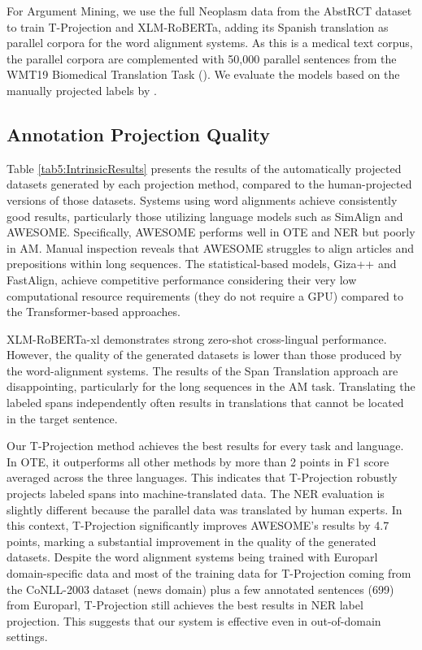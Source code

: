 For Argument Mining, we use the full Neoplasm data from the AbstRCT dataset to train T-Projection and XLM-RoBERTa, adding its Spanish translation as parallel corpora for the word alignment systems. As this is a medical text corpus, the parallel corpora are complemented with 50,000 parallel sentences from the WMT19 Biomedical Translation Task (\cite{bawden-etal-2019-findings}). We evaluate the models based on the manually projected labels by \citet{DBLP:journals/corr/abs-2301-10527}.

\subsection{Annotation Projection Quality}



Table \ref{tab5:IntrinsicResults} presents the results of the automatically projected datasets generated by each projection method, compared to the human-projected versions of those datasets. Systems using word alignments achieve consistently good results, particularly those utilizing language models such as SimAlign and AWESOME. Specifically, AWESOME performs well in OTE and NER but poorly in AM. Manual inspection reveals that AWESOME struggles to align articles and prepositions within long sequences. The statistical-based models, Giza++ and FastAlign, achieve competitive performance considering their very low computational resource requirements (they do not require a GPU) compared to the Transformer-based approaches.

XLM-RoBERTa-xl demonstrates strong zero-shot cross-lingual performance. However, the quality of the generated datasets is lower than those produced by the word-alignment systems. The results of the Span Translation approach are disappointing, particularly for the long sequences in the AM task. Translating the labeled spans independently often results in translations that cannot be located in the target sentence.


Our T-Projection method achieves the best results for every task and language. In OTE, it outperforms all other methods by more than 2 points in F1 score averaged across the three languages. This indicates that T-Projection robustly projects labeled spans into machine-translated data. The NER evaluation is slightly different because the parallel data was translated by human experts. In this context, T-Projection significantly improves AWESOME's results by 4.7 points, marking a substantial improvement in the quality of the generated datasets. Despite the word alignment systems being trained with Europarl domain-specific data and most of the training data for T-Projection coming from the CoNLL-2003 dataset (news domain) plus a few annotated sentences (699) from Europarl, T-Projection still achieves the best results in NER label projection. This suggests that our system is effective even in out-of-domain settings. 

